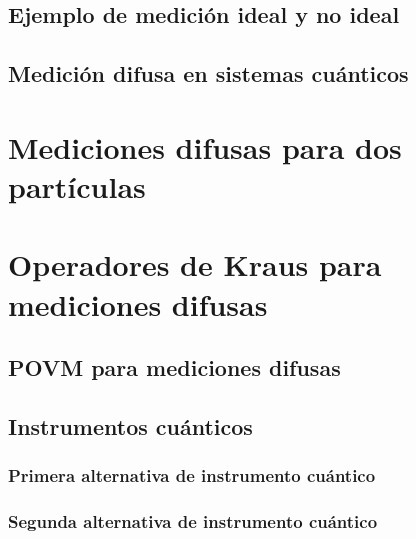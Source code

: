 \subsection{Ejemplo de medición ideal y no ideal}



\subsection{Medición difusa en sistemas cuánticos}



\section{Mediciones difusas para dos partículas} %




\section{Operadores de Kraus para mediciones difusas} %




\subsection{POVM para mediciones difusas}\label{Sec_POVM_para_mediciones_difusas} %




\subsection{Instrumentos cuánticos}\label{sec:instrumentos-cuanticos} %




\subsubsection{Primera alternativa de instrumento cuántico} %

\subsubsection{Segunda alternativa de instrumento cuántico}

